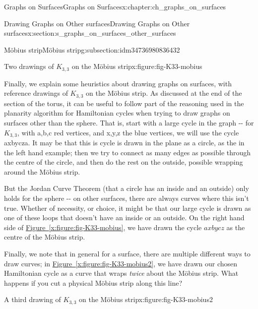 \documentclass[oneside,10pt,]{book}
\newcommand{\xreffont}{\relax}
\numberwithin{equation}{section}
\begin{document}
\begin{chapterptx}{Graphs on Surfaces}{}{Graphs on Surfaces}{}{}{x:chapter:ch_graphs_on_surfaces}
\begin{sectionptx}{Drawing Graphs on Other surfaces}{}{Drawing Graphs on Other surfaces}{}{}{x:section:s_graphs_on_surfaces_other_surfaces}
\begin{subsectionptx}{Möbius strip}{}{Möbius strip}{}{}{g:subsection:idm34736980836432}
\begin{figureptx}{Two drawings of \(K_{3,3}\) on the Möbius strip}{x:figure:fig-K33-mobius}{}
\begin{image}{0}{1}{0}
{
}%
\end{image}%
\tcblower
\end{figureptx}%
Finally, we explain some heuristics about drawing graphs on surfaces, with reference drawings of \(K_{3,3}\) on the Möbius strip.  As discussed at the end of the section of the torus, it can be useful to follow part of the reasoning used in the planarity algorithm for Hamiltonian cycles when trying to draw graphs on surfaces other than the sphere.  That is, start with a large cycle in the graph -{}-{} for \(K_{3,3}\), with \textdollar{}a,b,c\textdollar{} red vertices, and \textdollar{}x,y,z\textdollar{} the blue vertices, we will use the cycle \textdollar{}axbycza\textdollar{}.  It may be that this is cycle is drawn in the plane as a circle, as the in the left hand example; then we try to connect as many edges as possible through the centre of the circle, and then do the rest on the outside, possible wrapping around the Möbius strip.%
\par
But the Jordan Curve Theorem (that a circle has an inside and an outside) only holds for the sphere -{}-{} on other surfaces, there are always curves where this isn't true.  Whether of necessity, or choice, it might be that our large cycle is drawn as one of these loops that doesn't have an inside or an outside.  On the right hand side of \hyperref[x:figure:fig-K33-mobius]{Figure~{\xreffont\ref{x:figure:fig-K33-mobius}}}, we have drawn the cycle \(axbycz\) as the centre of the Möbius strip.%
\par
Finally, we note that in general for a surface, there are multiple different ways to draw curves; in \hyperref[x:figure:fig-K33-mobius2]{Figure~{\xreffont\ref{x:figure:fig-K33-mobius2}}}, we have drawn our chosen Hamiltonian cycle as a curve that wraps \emph{twice} about the Möbius strip.  What happens if you cut a physical Möbius strip along this line?%
\begin{figureptx}{A third drawing of \(K_{3,3}\) on the Möbius strip}{x:figure:fig-K33-mobius2}{}%
\begin{image}{0}{1}{0}%
\resizebox{\linewidth}{!}{%
\begin{tikzpicture}


\end{tikzpicture}}
\end{image}
\end{figureptx}
\end{subsectionptx}
\end{sectionptx}
\end{chapterptx}
\end{document}
